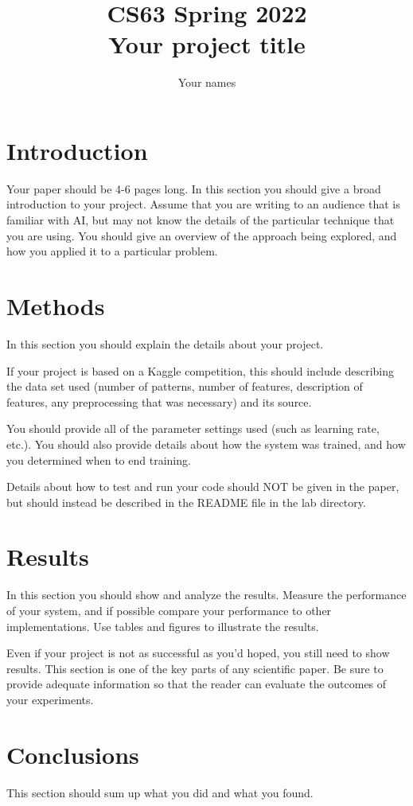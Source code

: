 \documentclass[11pt]{article}
\title{CS63 Spring 2022\\Your project title}
\author{Your names}
\date{}
\begin{document}
\maketitle

\section{Introduction}

Your paper should be 4-6 pages long.  In this section you should give
a broad introduction to your project.  Assume that you are writing to
an audience that is familiar with AI, but may not know the details of
the particular technique that you are using.  You should give an
overview of the approach being explored, and how you applied it to a
particular problem. 

\section{Methods}

In this section you should explain the details about your project.

If your project is based on a Kaggle competition, this should include
describing the data set used (number of patterns, number of features,
description of features, any preprocessing that was necessary) and its
source.

You should provide all of the parameter settings used (such as
learning rate, etc.).  You should also provide details about how the
system was trained, and how you determined when to end training.

Details about how to test and run your code should NOT be given in the
paper, but should instead be described in the README file in the lab
directory. 

\section{Results}

In this section you should show and analyze the results.  Measure the
performance of your system, and if possible compare your performance
to other implementations. Use tables and figures to illustrate the
results.  

Even if your project is not as successful as you'd hoped, you still
need to show results.  This section is one of the key parts of any
scientific paper.  Be sure to provide adequate information so that the
reader can evaluate the outcomes of your experiments. 

\section{Conclusions}

This section should sum up what you did and what you found.  
\end{document}
